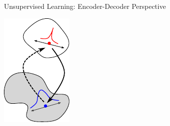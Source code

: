 \documentclass{beamer}
\begin{document}
\begin{frame}{Unsupervised Learning: Encoder-Decoder Perspective}
\begin{minipage}{0.32\textwidth}
\includegraphics[width=\columnwidth]{encode_decode.pdf}
\end{minipage}
\hfill




\end{frame}
\end{document}
